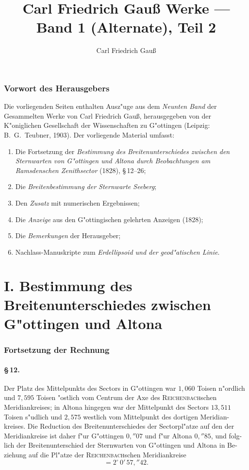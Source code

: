 \documentclass[12pt,a4paper]{article}
\title{Carl Friedrich Gau\ss{} Werke --- Band 1 (Alternate), Teil 2}
\author{Carl Friedrich Gau\ss{}}
\date{}
\theoremstyle{plain}
\theoremstyle{definition}
\theoremstyle{remark}
\begin{document}
\maketitle

\section*{Vorwort des Herausgebers}

Die vorliegenden Seiten enthalten Ausz"uge aus dem
\textit{Neunten Band} der Gesammelten Werke von Carl Friedrich
Gau\ss{}, herausgegeben von der K"oniglichen Gesellschaft der
Wissenschaften zu G"ottingen (Leipzig: B.~G.~Teubner, 1903).
Der vorliegende Material umfasst:
\begin{enumerate}
\item Die Fortsetzung der \textit{Bestimmung des Breitenunterschiedes
zwischen den Sternwarten von G"ottingen und Altona durch Beobachtungen
am Ramsdenschen Zenithsector} (1828), \S\,12--26;
\item Die \textit{Breitenbestimmung der Sternwarte Seeberg};
\item Den \textit{Zusatz} mit numerischen Ergebnissen;
\item Die \textit{Anzeige} aus den G"ottingischen gelehrten Anzeigen
(1828);
\item Die \textit{Bemerkungen} der Herausgeber;
\item Nachlass-Manuskripte zum \textit{Erdellipsoid und der
geod"atischen Linie}.
\end{enumerate}

\tableofcontents
\newpage

\part*{I. Bestimmung des Breitenunterschiedes zwischen G"ottingen und Altona}

\section*{Fortsetzung der Rechnung}

\subsection*{\S\,12.}

Der Platz des Mittelpunkts des Sectors in G"ottingen war $1{,}060$ Toisen
n"ordlich und $7{,}595$ Toisen "ostlich vom Centrum der Axe des \textsc{Reichenbach}schen
Meridiankreises; in Altona hingegen war der Mittelpunkt des Sectors $13{,}511$
Toisen s"udlich und $2{,}575$ westlich vom Mittelpunkt des dortigen Meridian-
kreises. Die Reduction des Breitenunterschiedes der Sectorpl"atze auf den der
Meridiankreise ist daher f"ur G"ottingen $0{,}''07$ und f"ur Altona $0{,}''85$, und folg-
lich der Breitenunterschied der Sternwarten von G"ottingen und Altona in Be-
ziehung auf die Pl"atze der \textsc{Reichenbach}schen Meridiankreise
\[
= 2^{\circ}\,0'\,57{,}''42.
\]
\end{document}

